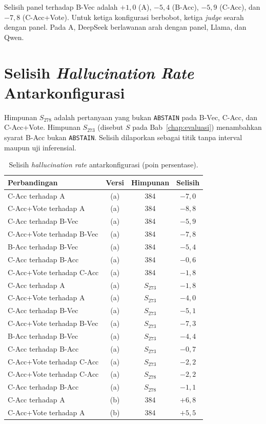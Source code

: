Selisih panel terhadap B-Vec adalah $+1{,}0$ (A), $-5{,}4$ (B-Acc), $-5{,}9$ (C-Acc), dan $-7{,}8$ (C-Acc+Vote). Untuk ketiga konfigurasi berbobot, ketiga \emph{judge} searah dengan panel. Pada A, DeepSeek berlawanan arah dengan panel, Llama, dan Qwen.

\section{Selisih \emph{Hallucination Rate} Antarkonfigurasi}
\label{sec:lamp-b-ci}

Himpunan $S_{278}$ adalah pertanyaan yang bukan \texttt{ABSTAIN} pada B-Vec, C-Acc, dan C-Acc+Vote. Himpunan $S_{273}$ (disebut $S$ pada Bab~\ref{chap:evaluasi}) menambahkan syarat B-Acc bukan \texttt{ABSTAIN}. Selisih dilaporkan sebagai titik tanpa interval maupun uji inferensial.

\begin{table}[!htbp]
\centering
\footnotesize
\caption{Selisih \emph{hallucination rate} antarkonfigurasi (poin persentase).}
\label{tab:lamp-ci}
\renewcommand{\arraystretch}{1.2}
\begin{tabularx}{\textwidth}{|>{\raggedright\arraybackslash}X|c|c|c|}
\hline
\textbf{Perbandingan} & \textbf{Versi} & \textbf{Himpunan} & \textbf{Selisih} \\
\hline
C-Acc terhadap A & (a) & 384 & $-7{,}0$ \\
C-Acc+Vote terhadap A & (a) & 384 & $-8{,}8$ \\
C-Acc terhadap B-Vec & (a) & 384 & $-5{,}9$ \\
C-Acc+Vote terhadap B-Vec & (a) & 384 & $-7{,}8$ \\
B-Acc terhadap B-Vec & (a) & 384 & $-5{,}4$ \\
C-Acc terhadap B-Acc & (a) & 384 & $-0{,}6$ \\
C-Acc+Vote terhadap C-Acc & (a) & 384 & $-1{,}8$ \\
\hline
C-Acc terhadap A & (a) & $S_{273}$ & $-1{,}8$ \\
C-Acc+Vote terhadap A & (a) & $S_{273}$ & $-4{,}0$ \\
C-Acc terhadap B-Vec & (a) & $S_{273}$ & $-5{,}1$ \\
C-Acc+Vote terhadap B-Vec & (a) & $S_{273}$ & $-7{,}3$ \\
B-Acc terhadap B-Vec & (a) & $S_{273}$ & $-4{,}4$ \\
C-Acc terhadap B-Acc & (a) & $S_{273}$ & $-0{,}7$ \\
C-Acc+Vote terhadap C-Acc & (a) & $S_{273}$ & $-2{,}2$ \\
\hline
C-Acc+Vote terhadap C-Acc & (a) & $S_{278}$ & $-2{,}2$ \\
C-Acc terhadap B-Acc & (a) & $S_{278}$ & $-1{,}1$ \\
\hline
C-Acc terhadap A & (b) & 384 & $+6{,}8$ \\
C-Acc+Vote terhadap A & (b) & 384 & $+5{,}5$ \\
\hline
\end{tabularx}
\end{table}

